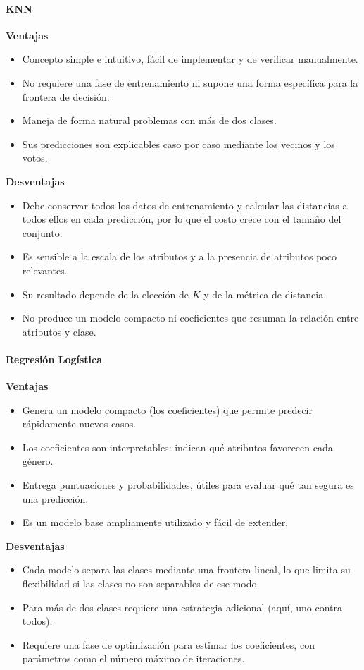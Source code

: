 \documentclass[]{article}
\begin{document}
\paragraph*{KNN}
\textbf{Ventajas}
\begin{itemize}[nosep]
  \item Concepto simple e intuitivo, fácil de implementar y de verificar manualmente.
  \item No requiere una fase de entrenamiento ni supone una forma específica para la frontera de decisión.
  \item Maneja de forma natural problemas con más de dos clases.
  \item Sus predicciones son explicables caso por caso mediante los vecinos y los votos.
\end{itemize}
\textbf{Desventajas}
\begin{itemize}[nosep]
  \item Debe conservar todos los datos de entrenamiento y calcular las distancias a todos ellos en cada predicción, por lo que el costo crece con el tamaño del conjunto.
  \item Es sensible a la escala de los atributos y a la presencia de atributos poco relevantes.
  \item Su resultado depende de la elección de $K$ y de la métrica de distancia.
  \item No produce un modelo compacto ni coeficientes que resuman la relación entre atributos y clase.
\end{itemize}

\paragraph*{Regresión Logística}
\textbf{Ventajas}
\begin{itemize}[nosep]
  \item Genera un modelo compacto (los coeficientes) que permite predecir rápidamente nuevos casos.
  \item Los coeficientes son interpretables: indican qué atributos favorecen cada género.
  \item Entrega puntuaciones y probabilidades, útiles para evaluar qué tan segura es una predicción.
  \item Es un modelo base ampliamente utilizado y fácil de extender.
\end{itemize}
\textbf{Desventajas}
\begin{itemize}[nosep]
  \item Cada modelo separa las clases mediante una frontera lineal, lo que limita su flexibilidad si las clases no son separables de ese modo.
  \item Para más de dos clases requiere una estrategia adicional (aquí, uno contra todos).
  \item Requiere una fase de optimización para estimar los coeficientes, con parámetros como el número máximo de iteraciones.
  
\end{itemize}
\end{document}
